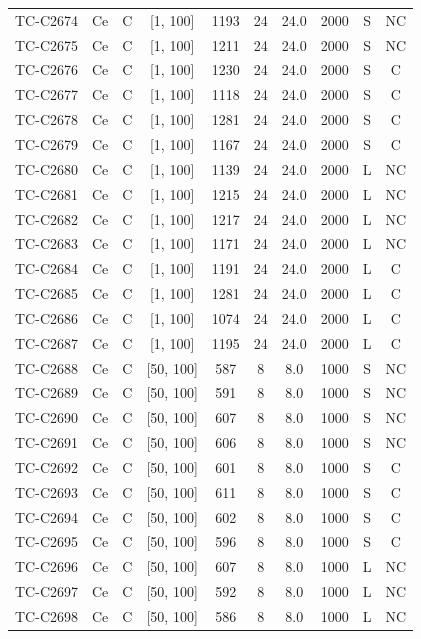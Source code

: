\begin{longtable}{lccccccccc}
TC-C2674 & Ce & C & [1, 100] & 1193 & 24 & 24.0 & 2000 & S & NC \\
TC-C2675 & Ce & C & [1, 100] & 1211 & 24 & 24.0 & 2000 & S & NC \\
TC-C2676 & Ce & C & [1, 100] & 1230 & 24 & 24.0 & 2000 & S & C \\
TC-C2677 & Ce & C & [1, 100] & 1118 & 24 & 24.0 & 2000 & S & C \\
TC-C2678 & Ce & C & [1, 100] & 1281 & 24 & 24.0 & 2000 & S & C \\
TC-C2679 & Ce & C & [1, 100] & 1167 & 24 & 24.0 & 2000 & S & C \\
TC-C2680 & Ce & C & [1, 100] & 1139 & 24 & 24.0 & 2000 & L & NC \\
TC-C2681 & Ce & C & [1, 100] & 1215 & 24 & 24.0 & 2000 & L & NC \\
TC-C2682 & Ce & C & [1, 100] & 1217 & 24 & 24.0 & 2000 & L & NC \\
TC-C2683 & Ce & C & [1, 100] & 1171 & 24 & 24.0 & 2000 & L & NC \\
TC-C2684 & Ce & C & [1, 100] & 1191 & 24 & 24.0 & 2000 & L & C \\
TC-C2685 & Ce & C & [1, 100] & 1281 & 24 & 24.0 & 2000 & L & C \\
TC-C2686 & Ce & C & [1, 100] & 1074 & 24 & 24.0 & 2000 & L & C \\
TC-C2687 & Ce & C & [1, 100] & 1195 & 24 & 24.0 & 2000 & L & C \\
TC-C2688 & Ce & C & [50, 100] & 587 & 8 & 8.0 & 1000 & S & NC \\
TC-C2689 & Ce & C & [50, 100] & 591 & 8 & 8.0 & 1000 & S & NC \\
TC-C2690 & Ce & C & [50, 100] & 607 & 8 & 8.0 & 1000 & S & NC \\
TC-C2691 & Ce & C & [50, 100] & 606 & 8 & 8.0 & 1000 & S & NC \\
TC-C2692 & Ce & C & [50, 100] & 601 & 8 & 8.0 & 1000 & S & C \\
TC-C2693 & Ce & C & [50, 100] & 611 & 8 & 8.0 & 1000 & S & C \\
TC-C2694 & Ce & C & [50, 100] & 602 & 8 & 8.0 & 1000 & S & C \\
TC-C2695 & Ce & C & [50, 100] & 596 & 8 & 8.0 & 1000 & S & C \\
TC-C2696 & Ce & C & [50, 100] & 607 & 8 & 8.0 & 1000 & L & NC \\
TC-C2697 & Ce & C & [50, 100] & 592 & 8 & 8.0 & 1000 & L & NC \\
TC-C2698 & Ce & C & [50, 100] & 586 & 8 & 8.0 & 1000 & L & NC \\

\end{longtable}
